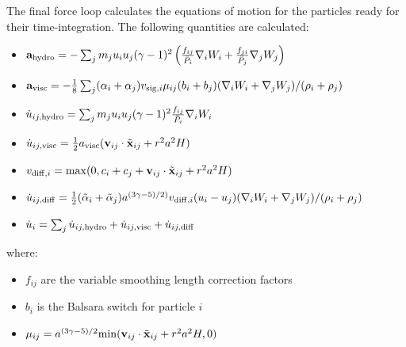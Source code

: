 The final force loop calculates the equations of motion for the particles ready for
their time-integration. The following quantities are calculated:
\begin{itemize}
	\item $\mathbf{a}_{\rm hydro} = -\sum_j m_j u_i u_j (\gamma - 1)^2 \left(
	       \frac{f_{ij}}{\bar{P}_i} \nabla_i W_i + \frac{f_{ji}}{\bar{P}_j} \nabla_j W_j\right)$
	\item $\mathbf{a}_{\rm visc} = - \frac{1}{8}\sum_j (\alpha_i + \alpha_j) v_{{\rm sig}, i}
	       \mu_{ij} (b_i + b_j) (\nabla_i W_i + \nabla_j W_j)/ (\rho_i + \rho_j)$
	\item $\dot{u}_{ij, {\rm hydro}} = \sum_j m_j u_i u_j (\gamma - 1)^2
	       \frac{f_{ij}}{\bar{P}_i} \nabla_i W_i$
	\item $\dot{u}_{ij, {\rm visc}} = \frac{1}{2} a_{\rm visc} (\mathbf{v}_{ij} \cdot \tilde{\mathbf{x}}_{ij} + r^2a^2 H)$
	\item $v_{{\rm diff}, i} = {\rm max}(0, c_i + c_j + \mathbf{v}_{ij} \cdot \tilde{\mathbf{x}}_{ij} + r^2a^2 H)$
	\item $\dot{u}_{ij, {\rm diff}} = \frac{1}{2}(\tilde{\alpha}_i + \tilde{\alpha}_j) a^{(3\gamma - 5)/2)}
	       v_{{\rm diff}, i} (u_i - u_j) (\nabla_i W_i + \nabla_j W_j)/ (\rho_i + \rho_j) $
	\item $\dot{u}_i = \sum_j \dot{u}_{ij, {\rm hydro}} +  \dot{u}_{ij, {\rm visc}} + \dot{u}_{ij, {\rm diff}}$
\end{itemize}
where:
\begin{itemize}
	\item $f_{ij}$ are the variable smoothing length correction factors
	\item $b_i$ is the Balsara switch for particle $i$
	\item $\mu_{ij} = a^{(3\gamma - 5)/2} {\rm min}(\mathbf{v}_{ij} \cdot \tilde{\mathbf{x}}_{ij} + r^2a^2 H, 0)$
\end{itemize}


